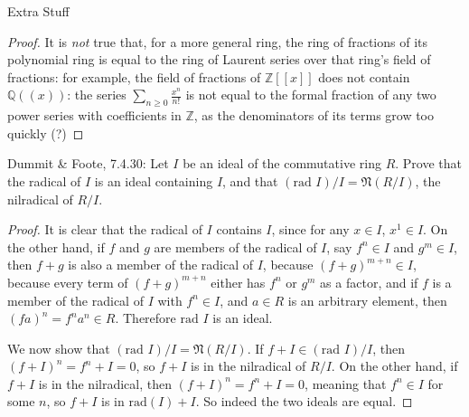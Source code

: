 \documentclass[12pt]{article}
\newcommand{\Q}{\mathbb{Q}}
\newcommand{\Z}{\mathbb{Z}}
\theoremstyle{definition}
\newenvironment{problem}[2][Problem]{\begin{trivlist}
\item[\hskip \labelsep {\bfseries #1}\hskip \labelsep {\bfseries #2.}]}{\end{trivlist}}
\begin{document}
\begin{section}{Extra Stuff}
\begin{proof}
		\par It is \textit{not} true that, for a more general ring, the ring of fractions of its polynomial ring is equal to the ring of Laurent series over that ring's field of fractions: for example, the field of fractions of $\Z[ [x]]$ does not contain $\Q( (x))$: the series $\sum_{n\geq 0} \frac{x^n}{n!}$ is not equal to the formal fraction of any two power series with coefficients in $\Z$, as the denominators of its terms grow too quickly (?)
	\end{proof}
	\begin{problem}{3}
	Dummit \& Foote, 7.4.30: Let $I$ be an ideal of the commutative ring $R$. Prove that the radical of $I$ is an ideal containing $I$, and that $(\text{rad }I)/I = \mathfrak N (R/I)$, the nilradical of $R/I$. \end{problem}
	\begin{proof}
		It is clear that the radical of $I$ contains $I$, since for any $x \in I$, $x^1 \in I$. On the other hand, if $f$ and $g$ are members of the radical of $I$, say $f^n \in I$ and $g^m \in I$, then $f+g$ is also a member of the radical of $I$, because $(f + g)^{m+n} \in I$, because every term of $(f+g)^{m+n}$ either has $f^n$ or $g^m$ as a factor, and if $f$ is a member of the radical of $I$ with $f^n \in I$, and $a\in R$ is an arbitrary element, then $(fa)^n = f^na^n \in R$. Therefore $\text{rad }I$ is an ideal.
		\par We now show that $(\text{rad }I)/I = \mathfrak{N}(R/I)$. If $f + I \in (\text{rad }I)/I$, then $(f + I)^n = f^n + I = 0$, so $f+I$ is in the nilradical of $R/I$. On the other hand, if $f+I$ is in the nilradical, then $(f + I)^n = f^n + I = 0$, meaning that $f^n \in I$ for some $n$, so $f + I$ is in $\text{rad}(I) + I$. So indeed the two ideals are equal.
	\end{proof}
\end{section}
\end{document}
